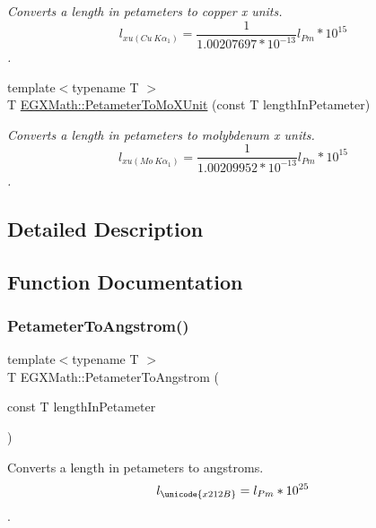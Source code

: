 \begin{DoxyCompactItemize}
\begin{DoxyCompactList}\small\item\em Converts a length in petameters to copper x units. \[ l_{xu(Cu\ K\alpha_1)}= \frac{1}{1.00207697*10^{-13}} l_{Pm} * 10^{15}\]. \end{DoxyCompactList}\item 
{\footnotesize template$<$typename T $>$ }\\T \mbox{\hyperlink{group___e_g_x_math-_conversions-_length_conversions-_s_i-_petameter-_non-_s_i_ga29419ba09bb33a7bc9e23f8cde2efea3}{E\+G\+X\+Math\+::\+Petameter\+To\+Mo\+X\+Unit}} (const T length\+In\+Petameter)
\begin{DoxyCompactList}\small\item\em Converts a length in petameters to molybdenum x units. \[ l_{xu(Mo\ K\alpha_1)}=\frac{1}{1.00209952*10^{-13}} l_{Pm} * 10^{15}\]. \end{DoxyCompactList}\end{DoxyCompactItemize}


\subsection{Detailed Description}


\subsection{Function Documentation}
\mbox{\label{group___e_g_x_math-_conversions-_length_conversions-_s_i-_petameter-_non-_s_i_ga2acc301b8b78a80d23a150da8cba3814}} 
\subsubsection{\texorpdfstring{Petameter\+To\+Angstrom()}{PetameterToAngstrom()}}
{\footnotesize\ttfamily template$<$typename T $>$ \\
T E\+G\+X\+Math\+::\+Petameter\+To\+Angstrom (\begin{DoxyParamCaption}\item[{const T}]{length\+In\+Petameter }\end{DoxyParamCaption})}



Converts a length in petameters to angstroms. \[ l_{\unicode{x212B}}=l_{Pm} * 10^{25} \]. 

